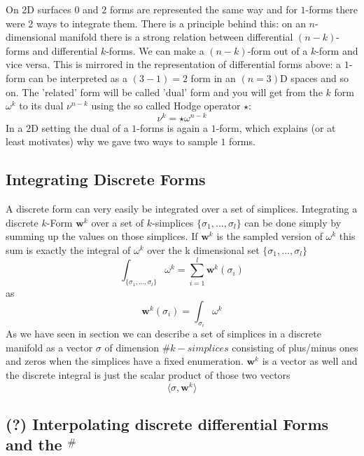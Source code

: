 On 2D surfaces $0$ and $2$ forms are represented the same way and for $1$-forms there were 2 ways to integrate them. There is a principle behind this: on an $n$-dimensional manifold there is a strong relation between differential $(n-k)$-forms and differential $k$-forms. We can make a $(n-k)$-form out of a $k$-form and vice versa. This is mirrored in the representation of differential forms above: a $1$-form can be interpreted as a $(3-1) =2$ form in an $(n =3)$D spaces and so on. The 'related' form will be called 'dual' form and you will get from the $k$ form $\omega^k$ to its dual $\nu^{n-k}$ using the so called Hodge operator $\star$:
\[\nu^{k} = \star \omega^{n-k}\]
In a 2D setting the dual of a $1$-forms is again a $1$-form, which explains (or at least motivates) why we gave two ways to sample $1$ forms.


\subsection{Integrating Discrete Forms}

A discrete form can very easily be integrated over a set of simplices. Integrating a discrete $k$-Form $\textbf{w}^k$ over a set of $k$-simplices $\{\sigma_1,...,\sigma_l\}$ can be done simply by summing up the values on those simplices. If $\textbf{w}^k$ is the sampled version of $\omega^k$ this sum is exactly the integral of $\omega^k$  over the k dimensional set $\{\sigma_1,...,\sigma_l\}$
\[\int_{\{\sigma_1,...,\sigma_l\}} \omega^k = \sum_{i=1}^l \textbf{w}^k(\sigma_i)\]
as
\[\textbf{w}^k(\sigma_i) = \int_{\sigma_i} \omega^k\]
As we have seen in section  we can describe a set of simplices in a discrete manifold as a vector $\sigma$ of dimension $\# k-simplices$ consisting of plus/minus ones and zeros when the simplices have a fixed enumeration. $\textbf{w}^k$ is a vector as well and the discrete integral is just the scalar product of those two vectors
$$\langle \sigma , \textbf{w}^k \rangle$$

\subsection{(?) Interpolating discrete differential Forms and the $^\#$ }

